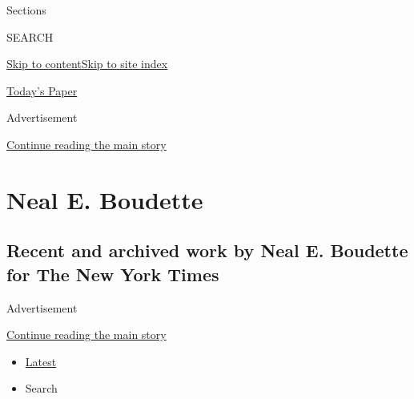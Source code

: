 Sections

SEARCH

\protect\hyperlink{site-content}{Skip to
content}\protect\hyperlink{site-index}{Skip to site index}

\href{https://myaccount.nytimes3xbfgragh.onion/auth/login?response_type=cookie\&client_id=vi}{}

\href{https://www.nytimes3xbfgragh.onion/section/todayspaper}{Today's
Paper}

Advertisement

\protect\hyperlink{after-top}{Continue reading the main story}

\hypertarget{neal-e-boudette}{%
\section{Neal E. Boudette}\label{neal-e-boudette}}

\hypertarget{recent-and-archived-work-by-neal-e-boudette-for-the-new-york-times}{%
\subsection{Recent and archived work by Neal E. Boudette for The New
York
Times}\label{recent-and-archived-work-by-neal-e-boudette-for-the-new-york-times}}

Advertisement

\protect\hyperlink{after-mid1}{Continue reading the main story}

\begin{itemize}
\tightlist
\item
  \protect\hyperlink{stream-panel}{Latest}
\item
  Search
\end{itemize}

